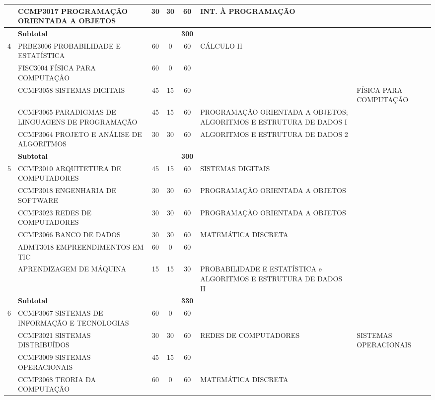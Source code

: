 \begin{center}
\begin{tiny}
\begin{longtable}{cp{4.5cm}cccp{2.8cm}p{2.8cm}}
      & CCMP3017 PROGRAMAÇÃO ORIENTADA A OBJETOS & 30 & 30 & 60 & INT. À PROGRAMAÇÃO & \\ \midrule
      & \multicolumn{3}{l}{\textbf{Subtotal}} & \textbf{300} & & \\ \midrule
    4 & PRBE3006 PROBABILIDADE E ESTATÍSTICA & 60 & 0 & 60 & CÁLCULO II & \\ \cline{2-7}
      & FISC3004 FÍSICA PARA COMPUTAÇÃO & 60 & 0 & 60 & & \\ \cline{2-7}
      & CCMP3058 SISTEMAS DIGITAIS & 45 & 15 & 60 & & FÍSICA PARA COMPUTAÇÃO \\ \cline{2-7}
      & CCMP3065 PARADIGMAS DE LINGUAGENS DE PROGRAMAÇÃO & 45 & 15 & 60 & PROGRAMAÇÃO ORIENTADA A OBJETOS; \newline ALGORITMOS E ESTRUTURA DE DADOS I & \\ \cline{2-7}
      & CCMP3064 PROJETO E ANÁLISE DE ALGORITMOS & 30 & 30 & 60 & ALGORITMOS E ESTRUTURA DE DADOS 2 & \\ \midrule
      & \multicolumn{3}{l}{\textbf{Subtotal}} & \textbf{300} & & \\ \midrule
    5 & CCMP3010 ARQUITETURA DE COMPUTADORES & 45 & 15 & 60 & SISTEMAS DIGITAIS & \\ \cline{2-7}
      & CCMP3018 ENGENHARIA DE SOFTWARE & 30 & 30 & 60 & PROGRAMAÇÃO ORIENTADA A OBJETOS & \\ \cline{2-7}
      & CCMP3023 REDES DE COMPUTADORES & 30 & 30 & 60 & PROGRAMAÇÃO ORIENTADA A OBJETOS & \\ \cline{2-7}
      & CCMP3066 BANCO DE DADOS & 30 & 30 & 60 & MATEMÁTICA DISCRETA & \\ \cline{2-7}
      & ADMT3018 EMPREENDIMENTOS EM TIC & 60 & 0 & 60 & & \\ \cline{2-7}
      & APRENDIZAGEM DE MÁQUINA & 15 & 15 & 30 & PROBABILIDADE E ESTATÍSTICA e ALGORITMOS E ESTRUTURA DE DADOS II & \\ \midrule
      & \multicolumn{3}{l}{\textbf{Subtotal}} & \textbf{330} & & \\ \midrule
    6 & CCMP3067 SISTEMAS DE INFORMAÇÃO E TECNOLOGIAS & 60 & 0 & 60 & & \\ \cline{2-7}
      & CCMP3021 SISTEMAS DISTRIBUÍDOS & 30 & 30 & 60 & REDES DE COMPUTADORES & SISTEMAS OPERACIONAIS \\ \cline{2-7}
      & CCMP3009 SISTEMAS OPERACIONAIS & 45 & 15 & 60 & & \\ \cline{2-7}
      & CCMP3068 TEORIA DA COMPUTAÇÃO & 60 & 0 & 60 & MATEMÁTICA DISCRETA & \\ \cline{2-7}

\end{longtable}
\end{tiny}
\end{center}
